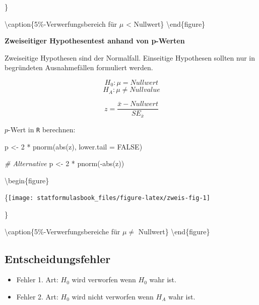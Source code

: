 \documentclass[
]{book}
\newenvironment{Shaded}{\begin{snugshade}}{\end{snugshade}}
\newcommand{\AttributeTok}[1]{\textcolor[rgb]{0.77,0.63,0.00}{#1}}
\newcommand{\CommentTok}[1]{\textcolor[rgb]{0.56,0.35,0.01}{\textit{#1}}}
\newcommand{\ConstantTok}[1]{\textcolor[rgb]{0.00,0.00,0.00}{#1}}
\newcommand{\DecValTok}[1]{\textcolor[rgb]{0.00,0.00,0.81}{#1}}
\newcommand{\FunctionTok}[1]{\textcolor[rgb]{0.00,0.00,0.00}{#1}}
\newcommand{\NormalTok}[1]{#1}
\newcommand{\OtherTok}[1]{\textcolor[rgb]{0.56,0.35,0.01}{#1}}
\newcommand{\SpecialCharTok}[1]{\textcolor[rgb]{0.00,0.00,0.00}{#1}}
\providecommand{\tightlist}{%
  \setlength{\itemsep}{0pt}\setlength{\parskip}{0pt}}
\begin{document}
\}

\textbackslash caption\{5\%-Verwerfungsbereich für \(\mu\) \textless{} Nullwert\}\label{fig:einskleiner-fig}
\textbackslash end\{figure\}

\textbf{Zweiseitiger Hypothesentest anhand von p-Werten}

Zweiseitige Hypothesen sind der Normalfall. Einseitige Hypothesen sollten nur in begründeten Ausnahmefällen formuliert werden.

\[H_0: \mu = Nullwert\]
\[H_A: \mu \neq Nullvalue\]

\begin{equation}
  z = \frac{\bar{x}-Nullwert}{SE_{\bar{x}}}
  \label{eq:ztwosided}
\end{equation}

\(p\)-Wert in \texttt{R} berechnen:

\begin{Shaded}
\begin{Highlighting}[]
\NormalTok{p }\OtherTok{\textless{}{-}} \DecValTok{2} \SpecialCharTok{*} \FunctionTok{pnorm}\NormalTok{(}\FunctionTok{abs}\NormalTok{(z), }\AttributeTok{lower.tail =} \ConstantTok{FALSE}\NormalTok{)}

\CommentTok{\# Alternative}
\NormalTok{p }\OtherTok{\textless{}{-}} \DecValTok{2} \SpecialCharTok{*} \FunctionTok{pnorm}\NormalTok{(}\SpecialCharTok{{-}}\FunctionTok{abs}\NormalTok{(z))}
\end{Highlighting}
\end{Shaded}

\textbackslash begin\{figure\}

\{\centering \texttt{[image: statformulasbook\_files/figure-latex/zweis-fig-1]}

\}

\textbackslash caption\{5\%-Verwerfungsbereiche für \(\mu \neq\) Nullwert\}\label{fig:zweis-fig}
\textbackslash end\{figure\}

\hypertarget{entscheidungsfehler}{%
\subsection{Entscheidungsfehler}\label{entscheidungsfehler}}

\begin{itemize}
\tightlist
\item
  Fehler 1. Art: \(H_0\) wird verworfen wenn \(H_0\) wahr ist.\\
\item
  Fehler 2. Art: \(H_0\) wird nicht verworfen wenn \(H_A\) wahr ist.
\end{itemize}
\end{document}
